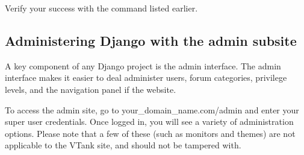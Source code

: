 Verify your success with the command listed earlier.

\subsection{Administering Django with the admin subsite}

A key component of any Django project is the admin interface.  The admin interface makes it easier to deal administer users, forum categories, privilege levels, and the navigation panel if the website. 

To access the admin site, go to your\_domain\_name.com/admin and enter your super user credentials.  Once logged in, you will see a variety of administration options.  Please note that a few of these (such as monitors and themes) are not applicable to the VTank site, and should not be tampered with.  
